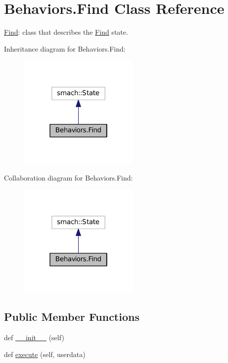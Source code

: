 \hypertarget{classBehaviors_1_1Find}{}\section{Behaviors.\+Find Class Reference}
\label{classBehaviors_1_1Find}


\hyperlink{classBehaviors_1_1Find}{Find}\+: class that describes the \hyperlink{classBehaviors_1_1Find}{Find} state.  




Inheritance diagram for Behaviors.\+Find\+:\nopagebreak
\begin{figure}[H]
\begin{center}
\leavevmode
\includegraphics[width=166pt]{classBehaviors_1_1Find__inherit__graph}
\end{center}
\end{figure}


Collaboration diagram for Behaviors.\+Find\+:\nopagebreak
\begin{figure}[H]
\begin{center}
\leavevmode
\includegraphics[width=166pt]{classBehaviors_1_1Find__coll__graph}
\end{center}
\end{figure}
\subsection*{Public Member Functions}
\begin{DoxyCompactItemize}
\item 
def \hyperlink{classBehaviors_1_1Find_a50fe385da0196f85d03c9215531e8468}{\+\_\+\+\_\+init\+\_\+\+\_\+} (self)
\item 
def \hyperlink{classBehaviors_1_1Find_a4910773265944430bb02fc53318fb956}{execute} (self, userdata)
\end{DoxyCompactItemize}


